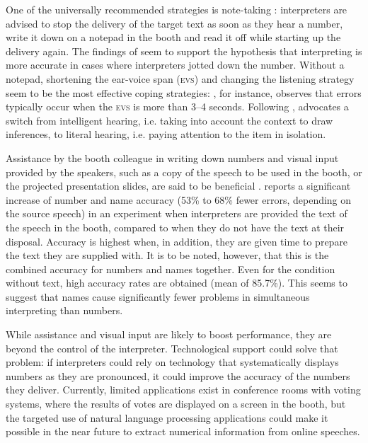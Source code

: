 \documentclass[output=paper]{langsci/langscibook}
\begin{document}
One of the universally recommended strategies is note-taking \citep{Setton1999,Jones2002,Mead2015}: interpreters are advised to stop the delivery of the target text as soon as they hear a number, write it down on a notepad in the booth and read it off while starting up the delivery again. The findings of \citet{Mazza2001} seem to support the hypothesis that interpreting is more accurate in cases where interpreters jotted down the number. Without a notepad, shortening the ear-voice span (\textsc{evs}) and changing the listening strategy seem to be the most effective coping strategies: \citet{Setton1999}, for instance, observes that errors typically occur when the \textsc{evs} is more than 3--4 seconds. Following \citet{Seleskovitch1975}, \citet{Pinochi2009} advocates a switch from intelligent hearing, i.e. taking into account the context to draw inferences, to literal hearing, i.e. paying attention to the item in isolation.

Assistance by the booth colleague in writing down numbers and visual input provided by the speakers, such as a copy of the speech to be used in the booth, or the projected presentation slides, are said to be beneficial \citep{Mead2015}. \citet{Lamberger-Felber2001} reports a significant increase of number and name accuracy (53\% to 68\% fewer errors, depending on the source speech) in an experiment when interpreters are provided the text of the speech in the booth, compared to when they do not have the text at their disposal. Accuracy is highest when, in addition, they are given time to prepare the text they are supplied with. It is to be noted, however, that this is the combined accuracy for numbers and names together. Even for the condition without text, high accuracy rates are obtained (mean of 85.7\%). This seems to suggest that names cause significantly fewer problems in simultaneous interpreting than numbers.\largerpage[-1]

While assistance and visual input are likely to boost performance, they are beyond the control of the interpreter. Technological support could solve that problem: if interpreters could rely on technology that systematically displays numbers as they are pronounced, it could improve the accuracy of the numbers they deliver. Currently, limited applications exist in conference rooms with voting systems, where the results of votes are displayed on a screen in the booth, but the targeted use of natural language processing applications could make it possible in the near future to extract numerical information from online speeches. 
\end{document}
